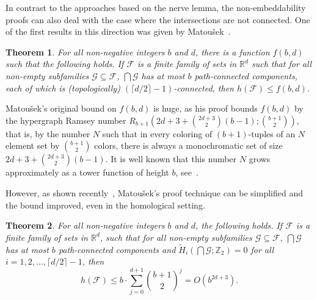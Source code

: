 \documentclass[a4paper,12pt]{amsart}
\newcommand{\R}{\mathbb{R}} 	%
\newcommand{\Z}{\mathbb{Z}} 	%
\newtheorem{theorem}{Theorem}
\theoremstyle{definition}
\begin{document}
In contrast to the approaches based on the nerve lemma, the non-embeddability proofs can also deal with the case where the intersections are not connected.
One of the first results in this direction was given by Matoušek~\cite{m-httucs-97}.
\begin{theorem}\cite{m-httucs-97}\label{thm:matousek}
For all non-negative integers $b$ and $d$,
there is a function $f(b,d)$
such that the following holds.
If $\mathcal F$ is a finite family of sets in $\R^d$ such that for all non-empty subfamilies $\mathcal G\subseteq \mathcal F$, $\bigcap \mathcal G$ has at most $b$ path-connected components, each of which is (topologically) $(\lceil d/2\rceil-1)$-connected, then $h(\mathcal F)\leq f(b,d)$.
\end{theorem}
Matoušek's original bound on $f(b,d)$ is huge, as his proof bounds $f(b,d)$ by the hypergraph Ramsey number $R_{b+1}\left(2d+3+\binom{2d+3}{2}(b-1);\binom{b+1}{2}\right)$, that is, by the number $N$ such that in every coloring of $(b+1)$-tuples of an $N$ element set by $\binom{b+1}{2}$ colors, there is always a monochromatic set of size $2d+3+\binom{2d+3}{2}(b-1)$. It is well known that this number $N$ grows approximately as a tower function of height $b$, see~\cite{ramseyBook}.

However, as shown recently~\cite{radonPolynomial}, Matoušek's proof technique can be simplified and the bound improved, even in the homological setting.
\begin{theorem}\cite{radonPolynomial}
For all non-negative integers $b$ and $d$, the following holds.
If $\mathcal F$ is a finite family of sets in $\R^d$, such that for all non-empty subfamilies $\mathcal G\subseteq \mathcal F$, $\bigcap \mathcal G$ has at most $b$ path-connected components and $\widetilde{H}_i(\bigcap\mathcal G;\Z_2)=0$ for all $i=1,2,\ldots, \lceil d/2\rceil -1$, then \[h(\mathcal F)\leq b\cdot \sum_{j=0}^{d+1}\binom{b+1}{2}^j= O(b^{2d+3}).\]
\end{theorem}
\end{document}
